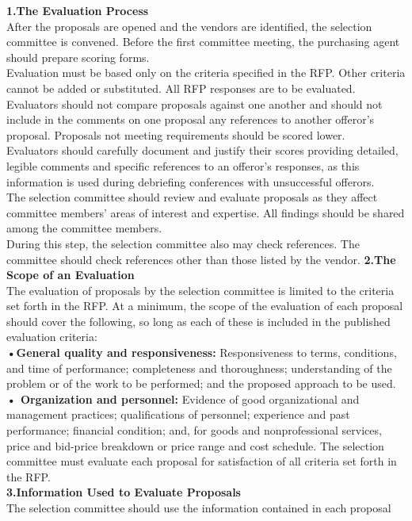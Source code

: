 \documentclass[12pt]{article}
\begin{document}
\textbf{1.The Evaluation Process}
\\After the proposals are opened and the vendors are identified, the selection
committee is convened. Before the first committee meeting, the purchasing
agent should prepare scoring forms. \\Evaluation must be based only on the
criteria specified in the RFP. Other criteria cannot be added or substituted.
All RFP responses are to be evaluated. \\Evaluators should not compare
proposals against one another and should not include in the comments on one
proposal any references to another offeror’s proposal. Proposals not meeting
requirements should be scored lower. \\Evaluators should carefully document and
justify their scores providing detailed, legible comments and specific references
to an offeror’s responses, as this information is used during debriefing
conferences with unsuccessful offerors.
 \\The selection committee should review and evaluate proposals as they affect
committee members’ areas of interest and expertise. All findings should be
shared among the committee members. \\During this step, the selection
committee also may check references. The committee should check references
other than those listed by the vendor.
\textbf{2.The Scope of an Evaluation }
\\The evaluation of proposals by the selection committee is limited to the criteria
set forth in the RFP. At a minimum, the scope of the evaluation of each proposal
should cover the following, so long as each of these is included in the published
evaluation criteria: \\
\textbf{•General quality and responsiveness:} Responsiveness to terms,
conditions, and time of performance; completeness and thoroughness;
understanding of the problem or of the work to be performed; and the
proposed approach to be used.\\
\textbf{• Organization and personnel:} Evidence of good organizational and
management practices; qualifications of personnel; experience and past
performance; financial condition; and, for goods and nonprofessional
services, price and bid-price breakdown or price range and cost schedule.
The selection committee must evaluate each proposal for satisfaction of all
criteria set forth in the RFP.\\
\textbf{3.Information Used to Evaluate Proposals}
\\The selection committee should use the information contained in each proposal
\end{document}
